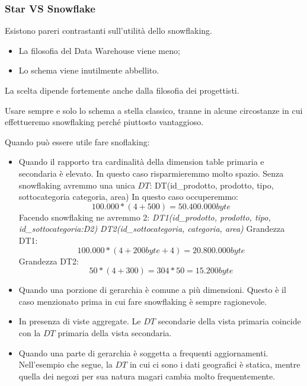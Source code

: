 \subsubsection{Star VS Snowflake}
Esistono pareri contrastanti sull'utilità dello snowflaking.
\begin{itemize}
	\item La filosofia del Data Warehouse viene meno;
	\item Lo schema viene inutilmente abbellito.
\end{itemize}
La scelta dipende fortemente anche dalla filosofia dei progettisti.
\begin{warn}
	Usare sempre e solo lo schema a stella classico, tranne in alcune circostanze in cui effettueremo snowflaking perché piuttosto vantaggioso.
\end{warn}
\noindent Quando può essere utile fare snoflaking:
\begin{itemize}
	\item Quando il rapporto tra cardinalità della dimension table primaria e secondaria è elevato. In questo caso risparmieremmo molto spazio.
	Senza snowflaking avremmo una unica $DT$:\newline
	DT(id\_prodotto, prodotto, tipo, sottocategoria categoria, area)\newline
	In questo caso occuperemmo:
	$$100.000*(4 + 500) = 50.400.000 byte$$
	Facendo snowflaking ne avremmo 2:\newline
	\textit{DT1(id\_prodotto, prodotto, tipo, id\_sottocategoria:D2)}\newline
	\textit{DT2(id\_sottocategoria, categoria, area)}\newline
	Grandezza DT1:
	$$100.000 * (4 + 200 byte + 4) = 20.800.000 byte$$\newline
	Grandezza DT2:
	$$50 * (4 + 300) = 304 * 50 = 15.200 byte$$
	\item Quando una porzione di gerarchia è comune a più dimensioni. Questo è il caso menzionato prima in cui fare snowflaking è sempre ragionevole.
	\item In presenza di viste aggregate. Le $DT$ secondarie della vista primaria coincide con la $DT$ primaria della vista secondaria.
	\item Quando una parte di gerarchia è soggetta a frequenti aggiornamenti. Nell'esempio che segue, la $DT$ in cui ci sono i dati geografici è statica, mentre quella dei negozi per sua natura magari cambia molto frequentemente.
\end{itemize}

